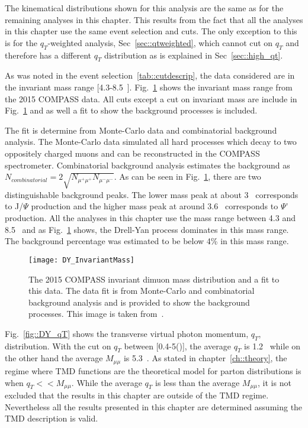 The kinematical distributions shown for this analysis are the same as for the
remaining analyses in this chapter.  This results from the fact that all the
analyses in this chapter use the same event selection and cuts.  The only
exception to this is for the $q_T$-weighted analysis, Sec~\ref{sec::qtweighted},
which cannot cut on $q_T$ and therefore has a different $q_T$ distribution as is
explained in Sec~\ref{sec::high_qt}.

As was noted in the event selection~\ref{tab::cutdescrip}, the data considered
are in the invariant mass range [4.3-8.5~{\gvcw}].
Fig.~\ref{fig::DY_InvariantMass} shows the invariant mass range from the 2015
COMPASS data.  All cuts except a cut on invariant mass are include in
Fig.~\ref{fig::DY_InvariantMass} and as well a fit to show the background
processes is included.

The fit is determine from Monte-Carlo data and combinatorial background
analysis.  The Monte-Carlo data simulated all hard processes which decay to two
oppositely charged muons and can be reconstructed in the COMPASS spectrometer.
Combinatorial background analysis estimates the background as $N_{combinatorial}
= 2\sqrt{N_{\mu^+\mu^+}N_{\mu^-\mu^-}}$.  As can be seen in
Fig.~\ref{fig::DY_InvariantMass}, there are two distinguishable background
peaks.  The lower mass peak at about 3~{\gvcw} corresponds to J/$\Psi$
production and the higher mass peak at around 3.6~{\gvcw} corresponds to $\Psi$'
production.  All the analyses in this chapter use the mass range between 4.3 and
8.5~{\gvcw} and as Fig.~\ref{fig::DY_InvariantMass} shows, the Drell-Yan process
dominates in this mass range.  The background percentage was estimated to be
below 4\% in this mass range.

\begin{figure}[h!t]
  \centering \texttt{[image: DY\_InvariantMass]}
  \caption{The 2015 COMPASS invariant dimuon mass distribution and a fit to this
    data.  The data fit is from Monte-Carlo and combinatorial background
    analysis and is provided to show the background processes.  This image is
    taken from~\cite{compassDYpaper}.}
  \label{fig::DY_InvariantMass}
\end{figure}

Fig.~\ref{fig::DY_qT} shows the transverse virtual photon momentum, $q_T$,
distribution.  With the cut on $q_T$ between [0.4-5({\gvc})], the average $q_T$
is 1.2~{\gvc} while on the other hand the average $M_{\mu\mu}$ is 5.3~{\gvcw}.
As stated in chapter~\ref{ch::theory}, the regime where TMD functions are the
theoretical model for parton distributions is when $q_T << M_{\mu\mu}$.  While
the average $q_T$ is less than the average $M_{\mu\mu}$, it is not excluded that
the results in this chapter are outside of the TMD regime.  Nevertheless all the
results presented in this chapter are determined assuming the TMD description is
valid.

